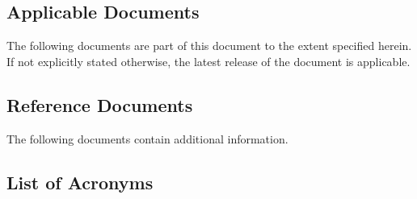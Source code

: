 \subsection{Applicable Documents}
The following documents are part of this document to the extent specified herein. If not explicitly stated otherwise, the latest release of the document is applicable.


\vspace*{0.8cm}
\begin{center}
\newrefcontext[labelprefix=AD]
\printbibtabular[env=bibtabular, heading=none, keyword=AD] %
\end{center}

\subsection{Reference Documents}
The following documents contain additional information.

\vspace*{0.8cm}
\begin{center}
\newrefcontext[labelprefix=RD]
\printbibtabular[env=bibtabular, heading=none, keyword=RD] %
\end{center}

\addtocounter{table}{-2}

\newpage

\subsection{List of Acronyms}

